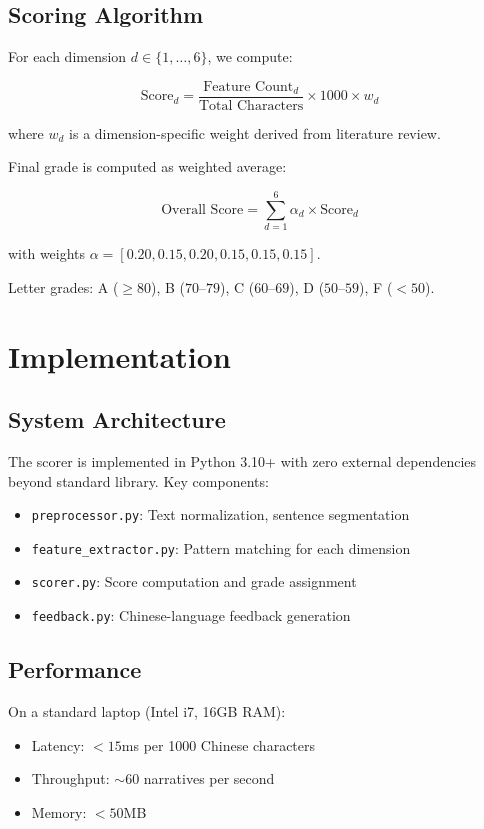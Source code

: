 \documentclass[11pt]{article}
\begin{document}
\subsection{Scoring Algorithm}

For each dimension $d \in \{1, \dots, 6\}$, we compute:

$$
\text{Score}_d = \frac{\text{Feature Count}_d}{\text{Total Characters}} \times 1000 \times w_d
$$

where $w_d$ is a dimension-specific weight derived from literature review.

Final grade is computed as weighted average:

$$
\text{Overall Score} = \sum_{d=1}^{6} \alpha_d \times \text{Score}_d
$$

with weights $\alpha = [0.20, 0.15, 0.20, 0.15, 0.15, 0.15]$.

Letter grades: A ($\geq 80$), B ($70$--$79$), C ($60$--$69$), D ($50$--$59$), F ($< 50$).

\section{Implementation}

\subsection{System Architecture}

The scorer is implemented in Python 3.10+ with zero external dependencies beyond standard library. Key components:

\begin{itemize}
  \item \texttt{preprocessor.py}: Text normalization, sentence segmentation
  \item \texttt{feature\_extractor.py}: Pattern matching for each dimension
  \item \texttt{scorer.py}: Score computation and grade assignment
  \item \texttt{feedback.py}: Chinese-language feedback generation
\end{itemize}

\subsection{Performance}

On a standard laptop (Intel i7, 16GB RAM):
\begin{itemize}
  \item Latency: $< 15$ms per 1000 Chinese characters
  \item Throughput: $\sim 60$ narratives per second
  \item Memory: $< 50$MB
\end{itemize}
\end{document}
